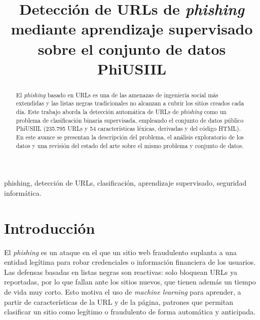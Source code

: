 \documentclass[conference]{IEEEtran}
\begin{document}
\title{Detección de URLs de \textit{phishing} mediante aprendizaje supervisado sobre el conjunto de datos PhiUSIIL}

\author{
}

\maketitle

\begin{abstract}
El \textit{phishing} basado en URLs es una de las amenazas de ingeniería social más
extendidas y las listas negras tradicionales no alcanzan a cubrir los sitios creados
cada día. Este trabajo aborda la detección automática de URLs de \textit{phishing} como
un problema de clasificación binaria supervisada, empleando el conjunto de datos público
PhiUSIIL (235.795 URLs y 54 características léxicas, derivadas y del código HTML). En este
avance se presentan la descripción del problema, el análisis exploratorio de los datos y
una revisión del estado del arte sobre el mismo problema y conjunto de datos.
\end{abstract}

\begin{IEEEkeywords}
phishing, detección de URLs, clasificación, aprendizaje supervisado, seguridad informática.
\end{IEEEkeywords}

\section{Introducción}
El \textit{phishing} es un ataque en el que un sitio web fraudulento suplanta a una entidad
legítima para robar credenciales o información financiera de los usuarios. Las defensas
basadas en listas negras son reactivas: solo bloquean URLs ya reportadas, por lo que fallan
ante los sitios nuevos, que tienen además un tiempo de vida muy corto. Esto motiva el uso de
\textit{machine learning} para aprender, a partir de características de la URL y de la página,
patrones que permitan clasificar un sitio como legítimo o fraudulento de forma automática y
anticipada.
\end{document}
